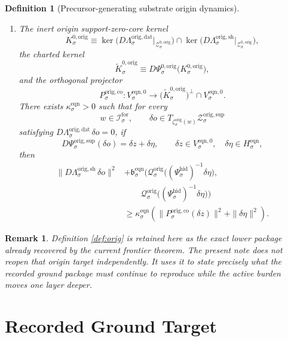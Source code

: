 \documentclass[11pt]{article}
\newcommand{\ForSpace}[1]{\mathcal I_{#1}^{\mathrm{for}}}
\newcommand{\HiddenChart}[1]{\Psi_{#1}^{\mathrm{hid}}}
\newcommand{\OrigData}[1]{\Lambda_{#1}^{\mathrm{orig,dat}}}
\newcommand{\OrigShellMap}[1]{\Lambda_{#1}^{\mathrm{orig,sh}}}
\newcommand{\OrigSupportShell}[1]{\mathcal Z_{#1}^{\mathrm{orig,sup}}}
\newcommand{\OrigZeroCore}[1]{\mathcal Z_{#1}^{0,\mathrm{orig}}}
\newcommand{\OrigEqChart}[1]{\Psi_{#1}^{\mathrm{orig,sup}}}
\newcommand{\OrigZeroChart}[1]{\Psi_{#1}^{0,\mathrm{orig}}}
\newcommand{\OrigCharge}[1]{\mathcal Q_{#1}^{\mathrm{orig}}}
\newcommand{\OrigEmbed}[1]{\zeta_{#1}^{\mathrm{orig}}}
\newcommand{\OrigKernel}[1]{K_{#1}^{0,\mathrm{orig}}}
\newcommand{\OrigKernelCh}[1]{\widetilde K_{#1}^{0,\mathrm{orig}}}
\newcommand{\OrigStateComp}[1]{P_{#1}^{\mathrm{orig,co}}}
\newcommand{\EqnPair}[1]{\mathfrak b_{#1}^{\mathrm{eqn}}}
\newcommand{\EqnHidden}[1]{H_{#1}^{\mathrm{eqn}}}
\newcommand{\EqnZero}[1]{V_{#1}^{\mathrm{eqn},0}}
\newtheorem{definition}{Definition}
\newtheorem{remark}{Remark}
\begin{document}
\begin{definition}[Precursor-generating substrate origin dynamics]
\begin{enumerate}
    \item The inert origin support-zero-core kernel
    \[
    \OrigKernel{\sigma}
    \equiv
    \ker\bigl(D\OrigData{\sigma}\big|_{\OrigZeroCore{\sigma}}\bigr)
    \cap
    \ker\bigl(D\OrigShellMap{\sigma}\big|_{\OrigZeroCore{\sigma}}\bigr),
    \]
    the charted kernel
    \[
    \OrigKernelCh{\sigma}
    \equiv
    D\OrigZeroChart{\sigma}\bigl(\OrigKernel{\sigma}\bigr),
    \]
    and the orthogonal projector
    \[
    \OrigStateComp{\sigma}:
    \EqnZero{\sigma}\to
    \bigl(\OrigKernelCh{\sigma}\bigr)^{\perp}\cap\EqnZero{\sigma}.
    \]
    There exists \(\kappa_{\sigma}^{\mathrm{eqn}}>0\) such that for every
    \[
    w\in\ForSpace{\sigma},
    \qquad
    \delta o\in T_{\OrigEmbed{\sigma}(w)}\OrigSupportShell{\sigma}
    \]
    satisfying \(D\OrigData{\sigma}\,\delta o=0\), if
    \[
    D\OrigEqChart{\sigma}(\delta o)=\delta z+\delta\eta,
    \qquad
    \delta z\in\EqnZero{\sigma},
    \quad
    \delta\eta\in\EqnHidden{\sigma},
    \]
    then
    \begin{equation}
    \begin{aligned}
    \|D\OrigShellMap{\sigma}\,\delta o\|^{2}
    &+
    \EqnPair{\sigma}\bigl(
    \OrigCharge{\sigma}\bigl((\HiddenChart{\sigma})^{-1}\delta\eta\bigr),\\
    &\qquad
    \OrigCharge{\sigma}\bigl((\HiddenChart{\sigma})^{-1}\delta\eta\bigr)
    \bigr)
    \\
    &\ge
    \kappa_{\sigma}^{\mathrm{eqn}}
    \left(
    \|\OrigStateComp{\sigma}(\delta z)\|^{2}
    +
    \|\delta\eta\|^{2}
    \right).
    \end{aligned}
    \label{eq:origcoercive}
    \end{equation}
\end{enumerate}
\end{definition}

\begin{remark}
Definition \ref{def:orig} is retained here as the exact lower package already recovered by the current frontier theorem. The present note does not reopen that origin target independently. It uses it to state precisely what the recorded ground package must continue to reproduce while the active burden moves one layer deeper.
\end{remark}

\section{Recorded Ground Target}
\end{document}
